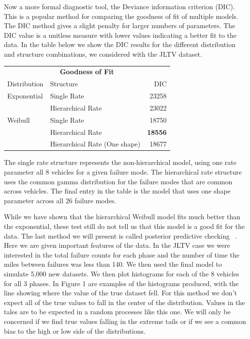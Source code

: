 \documentclass[12pt]{article}
\begin{document}
Now a more formal diagnostic tool, the Deviance information criterion (DIC).
This is a popular method for comparing the goodness of fit of multiple models.
The DIC method gives a slight penalty for larger numbers of parameters.  The DIC
value is a unitless measure with lower values indicating a better fit to the
data.  In the table below we show the DIC results for the different distribution
and structure combinations, we considered with the JLTV dataset.

\begin{tabular}{|l|l|r|}
\multicolumn{3}{c}{\textbf{Goodness of Fit}} \\
\cline{1-3}
Distribution    & Structure & DIC \\
\hline
Exponential   & Single Rate                       & 23258               \\
              & Hierarchical Rate                 & 23022               \\
Weibull       & Single Rate                       & 18750               \\
              & Hierarchical Rate                 & \textbf{18556}      \\
              & Hierarchical Rate (One shape)     & 18677               \\
\hline
\end{tabular}

The single rate structure represents the non-hierarchical model, using one rate
parameter all 8 vehicles for a given failure mode.  The hierarchical rate
structure uses the common gamma distribution for the failure modes that are
common across vehicles.  The final entry in the table is the model that uses one
shape parameter across all 26 failure modes.

While we have shown that the hierarchical Weibull model fits much better than
the exponential, these test still do not tell us that this model is a good fit
for the data.  The last method we will present is called posterior predictive
checking ~\cite{ref3}.  Here we are given important features of the data.
In the JLTV case we were interested in the total failure counts for each phase
and the number of time the miles between failures was less than 140.  We then
used the final model to simulate 5,000 new datasets.  We then plot histograms
for each of the 8 vehicles for all 3 phases.  In Figure 1 are examples of the
histograms produced, with the line showing where the value of the true dataset
fell.  For this method we don’t expect all of the true values to fall in the
center of the distribution.  Values in the tales are to be expected in a random
processes like this one.  We will only be concerned if we find true values
falling in the extreme tails or if we see a common bias to the high or low side
of the distributions.
\end{document}
